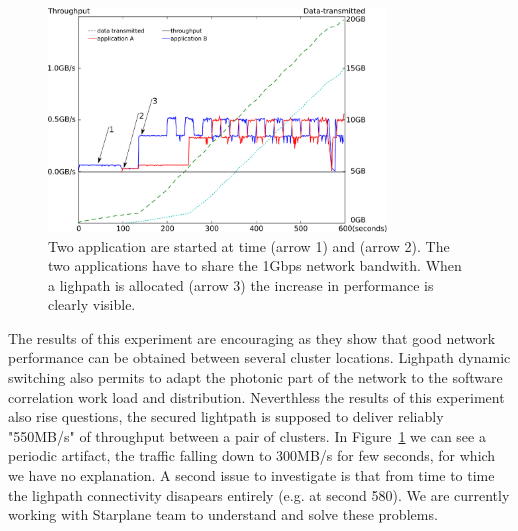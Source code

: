 \begin{figure}[ht]
  \centering
  \includegraphics[width=0.8\textwidth] {img/timing.eps}
  \caption{\label{fig:timing} Two application are started at time
    (arrow 1) and (arrow 2). The two applications have to share the
    1Gbps network bandwith. When a lighpath is allocated (arrow 3) the
    increase in performance is clearly visible.}
\end{figure} 

The results of this experiment are encouraging as they show that good
network performance can be obtained between several cluster
locations. Lighpath dynamic switching also permits to adapt the
photonic part of the network to the software correlation work load and
distribution.  Neverthless the results of this experiment also rise
questions, the secured lightpath is supposed to deliver reliably
"550MB/s" of throughput between a pair of clusters.  In
Figure~\ref{fig:timing} we can see a periodic artifact, the traffic
falling down to 300MB/s for few seconds, for which we have no
explanation. A second issue to investigate is that from time to time
the lighpath connectivity disapears entirely (e.g. at second 580). We
are currently working with Starplane team to understand and solve
these problems.



